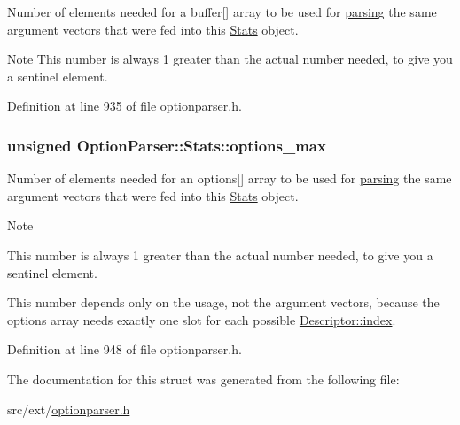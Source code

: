 Number of elements needed for a {\ttfamily buffer}\mbox{[}\mbox{]} array to be used for \hyperlink{class_option_parser_1_1_parser_adbde29c0025d0ec88f8b41a656ab45a1}{parsing} the same argument vectors that were fed into this \hyperlink{struct_option_parser_1_1_stats}{Stats} object. 

\begin{DoxyNote}{Note}
This number is always 1 greater than the actual number needed, to give you a sentinel element. 
\end{DoxyNote}


Definition at line 935 of file optionparser.\-h.

\hypertarget{struct_option_parser_1_1_stats_a32b27e18309da5c4c6ebc5ee3e42f98c}{
\subsubsection[{options\-\_\-max}]{\setlength{\rightskip}{0pt plus 5cm}unsigned Option\-Parser\-::\-Stats\-::options\-\_\-max}}\label{struct_option_parser_1_1_stats_a32b27e18309da5c4c6ebc5ee3e42f98c}


Number of elements needed for an {\ttfamily options}\mbox{[}\mbox{]} array to be used for \hyperlink{class_option_parser_1_1_parser_adbde29c0025d0ec88f8b41a656ab45a1}{parsing} the same argument vectors that were fed into this \hyperlink{struct_option_parser_1_1_stats}{Stats} object. 

\begin{DoxyNote}{Note}
\begin{DoxyItemize}
\item This number is always 1 greater than the actual number needed, to give you a sentinel element. \item This number depends only on the {\ttfamily usage}, not the argument vectors, because the {\ttfamily options} array needs exactly one slot for each possible \hyperlink{struct_option_parser_1_1_descriptor_ae62860781844b44c0bd4f730c96701d7}{Descriptor\-::index}. \end{DoxyItemize}

\end{DoxyNote}


Definition at line 948 of file optionparser.\-h.



The documentation for this struct was generated from the following file\-:\begin{DoxyCompactItemize}
\item 
src/ext/\hyperlink{optionparser_8h}{optionparser.\-h}\end{DoxyCompactItemize}

